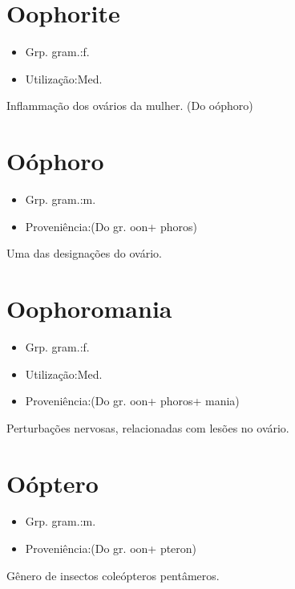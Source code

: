 \section{Oophorite}
\begin{itemize}
\item {Grp. gram.:f.}
\end{itemize}
\begin{itemize}
\item {Utilização:Med.}
\end{itemize}
Inflammação dos ovários da mulher.
(Do \textunderscore oóphoro\textunderscore )
\section{Oóphoro}
\begin{itemize}
\item {Grp. gram.:m.}
\end{itemize}
\begin{itemize}
\item {Proveniência:(Do gr. \textunderscore oon\textunderscore  + \textunderscore phoros\textunderscore )}
\end{itemize}
Uma das designações do \textunderscore ovário\textunderscore .
\section{Oophoromania}
\begin{itemize}
\item {Grp. gram.:f.}
\end{itemize}
\begin{itemize}
\item {Utilização:Med.}
\end{itemize}
\begin{itemize}
\item {Proveniência:(Do gr. \textunderscore oon\textunderscore  + \textunderscore phoros\textunderscore  + \textunderscore mania\textunderscore )}
\end{itemize}
Perturbações nervosas, relacionadas com lesões no ovário.
\section{Oóptero}
\begin{itemize}
\item {Grp. gram.:m.}
\end{itemize}
\begin{itemize}
\item {Proveniência:(Do gr. \textunderscore oon\textunderscore  + \textunderscore pteron\textunderscore )}
\end{itemize}
Gênero de insectos coleópteros pentâmeros.
